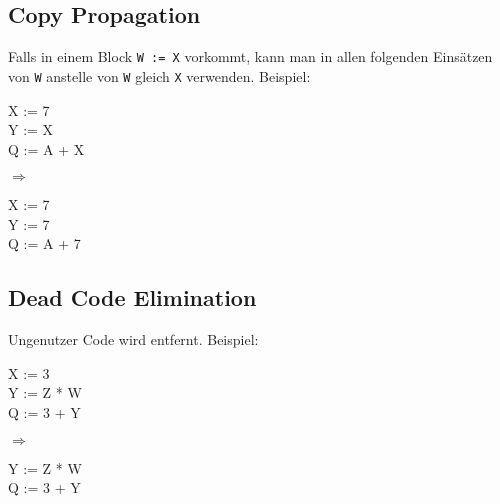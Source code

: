 \subsection{Copy Propagation}

Falls in einem Block \texttt{W := X} vorkommt, kann man in allen folgenden
Einsätzen von \texttt{W} anstelle von \texttt{W} gleich \texttt{X} verwenden.
Beispiel:

\begin{varwidth}{\textwidth}\ttfamily
X := 7\\
Y := X\\
Q := A + X
\end{varwidth}%
\hspace{1cm}$\Rightarrow$\hspace{1cm}%
\begin{varwidth}{\textwidth}\ttfamily
X := 7\\
Y := 7\\
Q := A + 7
\end{varwidth}

\subsection{Dead Code Elimination}

Ungenutzer Code wird entfernt. Beispiel:

\begin{varwidth}{\textwidth}\ttfamily
X := 3\\
Y := Z * W\\
Q := 3 + Y
\end{varwidth}%
\hspace{1cm}$\Rightarrow$\hspace{1cm}%
\begin{varwidth}{\textwidth}\ttfamily
Y := Z * W\\
Q := 3 + Y
\end{varwidth}
